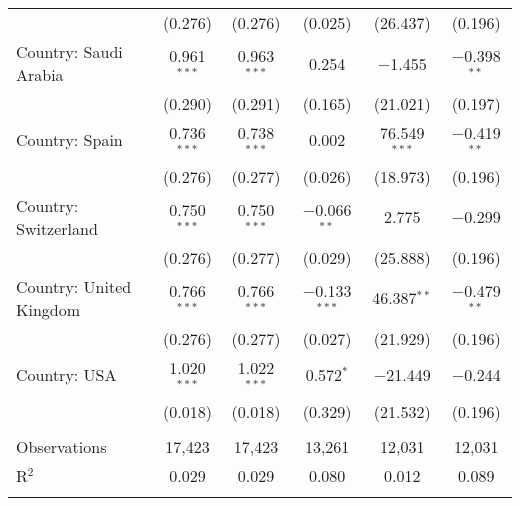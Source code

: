 \begin{tabular}{@{\extracolsep{5pt}}lccccc}
  & (0.276) & (0.276) & (0.025) & (26.437) & (0.196) \\ 
  Country: Saudi Arabia & 0.961$^{***}$ & 0.963$^{***}$ & 0.254 & $-$1.455 & $-$0.398$^{**}$ \\ 
  & (0.290) & (0.291) & (0.165) & (21.021) & (0.197) \\ 
  Country: Spain & 0.736$^{***}$ & 0.738$^{***}$ & 0.002 & 76.549$^{***}$ & $-$0.419$^{**}$ \\ 
  & (0.276) & (0.277) & (0.026) & (18.973) & (0.196) \\ 
  Country: Switzerland & 0.750$^{***}$ & 0.750$^{***}$ & $-$0.066$^{**}$ & 2.775 & $-$0.299 \\ 
  & (0.276) & (0.277) & (0.029) & (25.888) & (0.196) \\ 
  Country: United Kingdom & 0.766$^{***}$ & 0.766$^{***}$ & $-$0.133$^{***}$ & 46.387$^{**}$ & $-$0.479$^{**}$ \\ 
  & (0.276) & (0.277) & (0.027) & (21.929) & (0.196) \\ 
  Country: USA & 1.020$^{***}$ & 1.022$^{***}$ & 0.572$^{*}$ & $-$21.449 & $-$0.244 \\ 
  & (0.018) & (0.018) & (0.329) & (21.532) & (0.196) \\ 
 \hline \\[-1.8ex] 

Observations & 17,423 & 17,423 & 13,261 & 12,031 & 12,031 \\ 
R$^{2}$ & 0.029 & 0.029 & 0.080 & 0.012 & 0.089 \\ 
\hline 
\hline \\[-1.8ex] 
\end{tabular} 